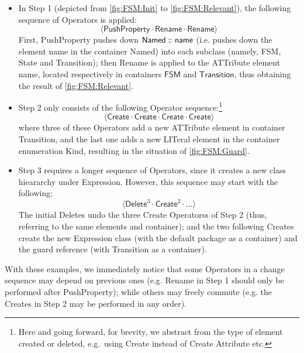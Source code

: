 \begin{itemize}
	\item In Step 1 (depicted from \cref{fig:FSM:Init} to \cref{fig:FSM:Relevant}),
	the following sequence of \textsf{Operator}s is applied:
	$$\langle \mathsf{PushProperty} \cdot \mathsf{Rename} \cdot \mathsf{Rename} \rangle$$
	First, \textsf{PushProperty} pushes down $\mathsf{Named} \,\colon\!\!\!\colon \mathsf{name}$
	(i.e. pushes down the \textsf{element} \textsf{name} in the \textsf{container}
	\textsf{Named})
	into each subclass (namely, \textsf{FSM}, \textsf{State} and \textsf{Transition});
	then \textsf{Rename} is applied to the \textsf{ATT}ribute \textsf{element} 
	\textsf{name}, located respectively in \textsf{container}s $\mathsf{FSM}$ and 
	$\mathsf{Transition}$, thus obtaining the result of \cref{fig:FSM:Relevant}.
	
	\item Step 2 only consists of the following \textsf{Operator} sequence:\footnote{Here and going forward, for brevity, we abstract from the type of element created or deleted, e.g.~using \textsf{Create} instead of \textsf{Create Attribute} etc.}
	$$\langle \mathsf{Create} \cdot \mathsf{Create} \cdot \mathsf{Create} \cdot \mathsf{Create} \rangle$$
	where three of these \textsf{Operator}s add a new \textsf{ATT}ribute \textsf{element}
	in \textsf{container} \textsf{Transition}, and the last one adds a new 
	\textsf{LIT}eral \textsf{element} in the \textsf{container} enumeration \textsf{Kind},
	resulting in the situation of \cref{fig:FSM:Guard}.
	
	\item Step 3 requires a longer sequence of \textsf{Operator}s, since it creates
	a new class hieararchy under \textsf{Expression}. However, this sequence may
	start with the following:
	$$\langle \mathsf{Delete}^3 \cdot \mathsf{Create}^2 \cdot \ldots \rangle$$
	The initial \textsf{Delete}s undo the three \textsf{Create} \textsf{Operators}s 
	of Step 2
	(thus, referring to the same \textsf{element}s and \textsf{container}); and
	the two following \textsf{Create}s create the new \textsf{Expression} class
	(with the default package as a \textsf{container}) and the \textsf{guard}
	reference (with \textsf{Transition} as a \textsf{container}).
\end{itemize}
With these examples, we immediately notice that some \textsf{Operator}s
in a change sequence may depend on previous ones (e.g. \textsf{Rename}
in Step 1 should only be performed after \textsf{PushProperty}); while others
may freely commute (e.g. the \textsf{Create}s in Step 2 may be performed in any 
order).